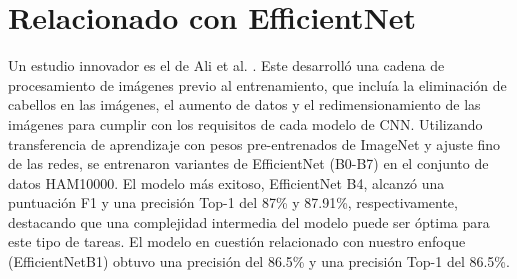 

\section {Relacionado con EfficientNet}

Un estudio innovador es el de Ali et al. . Este desarrolló una cadena de procesamiento de imágenes previo al entrenamiento, que incluía la eliminación de cabellos en las imágenes, el aumento de datos y el redimensionamiento de las imágenes para cumplir con los requisitos de cada modelo de CNN. Utilizando transferencia de aprendizaje con pesos pre-entrenados de ImageNet y ajuste fino de las redes, se entrenaron variantes de EfficientNet (B0-B7) en el conjunto de datos HAM10000. El modelo más exitoso, EfficientNet B4, alcanzó una puntuación F1 y una precisión Top-1 del 87\% y 87.91\%, respectivamente, destacando que una complejidad intermedia del modelo puede ser óptima para este tipo de tareas. El modelo en cuestión relacionado con nuestro enfoque (EfficientNetB1) obtuvo una precisión del 86.5\% y una precisión Top-1 del 86.5\%.


